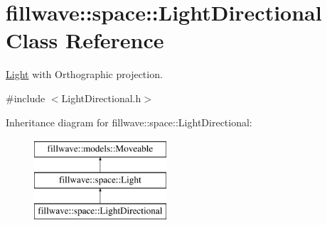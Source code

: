 \hypertarget{classfillwave_1_1space_1_1LightDirectional}{}\section{fillwave\+:\+:space\+:\+:Light\+Directional Class Reference}
\label{classfillwave_1_1space_1_1LightDirectional}


\hyperlink{classfillwave_1_1space_1_1Light}{Light} with Orthographic projection.  




{\ttfamily \#include $<$Light\+Directional.\+h$>$}

Inheritance diagram for fillwave\+:\+:space\+:\+:Light\+Directional\+:\begin{figure}[H]
\begin{center}
\leavevmode
\includegraphics[height=3.000000cm]{classfillwave_1_1space_1_1LightDirectional}
\end{center}
\end{figure}
